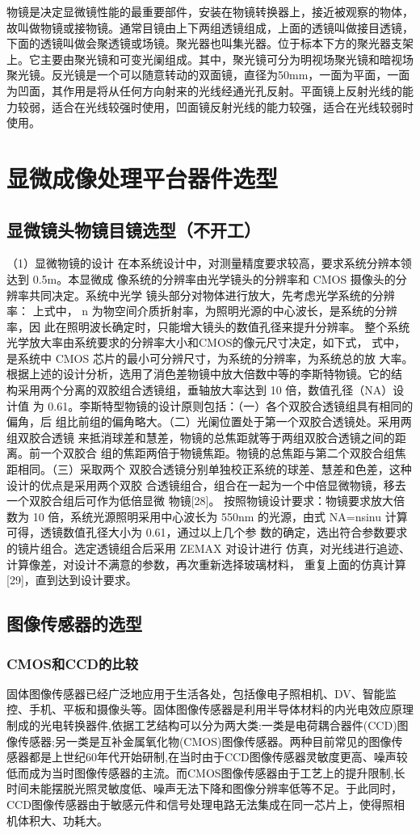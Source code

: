 物镜是决定显微镜性能的最重要部件，安装在物镜转换器上，接近被观察的物体，故叫做物镜或接物镜。通常目镜由上下两组透镜组成，上面的透镜叫做接目透镜，下面的透镜叫做会聚透镜或场镜。聚光器也叫集光器。位于标本下方的聚光器支架上。它主要由聚光镜和可变光阑组成。其中，聚光镜可分为明视场聚光镜和暗视场聚光镜。反光镜是一个可以随意转动的双面镜，直径为50mm，一面为平面，一面为凹面，其作用是将从任何方向射来的光线经通光孔反射。平面镜上反射光线的能力较弱，适合在光线较强时使用，凹面镜反射光线的能力较强，适合在光线较弱时使用。
	 
\section{显微成像处理平台器件选型}
\subsection{显微镜头物镜目镜选型（不开工）}
（1）显微物镜的设计 在本系统设计中，对测量精度要求较高，要求系统分辨本领达到 0.5m。本显微成 像系统的分辨率由光学镜头的分辨率和 CMOS 摄像头的分辨率共同决定。系统中光学 镜头部分对物体进行放大，先考虑光学系统的分辨率：
上式中， n 为物空间介质折射率，为照明光源的中心波长，是系统的分辨率，因 此在照明波长确定时，只能增大镜头的数值孔径来提升分辨率。 整个系统光学放大率由系统要求的分辨率大小和CMOS的像元尺寸决定，如下式，
式中，是系统中 CMOS 芯片的最小可分辨尺寸，为系统的分辨率，为系统总的放 大率。 根据上述的设计分析，选用了消色差物镜中放大倍数中等的李斯特物镜。它的结 构采用两个分离的双胶组合透镜组，垂轴放大率达到 10 倍，数值孔径（NA）设计值 为 0.61。李斯特型物镜的设计原则包括：（一）各个双胶合透镜组具有相同的偏角，后 组比前组的偏角略大。（二）光阑位置处于第一个双胶合透镜处。采用两组双胶合透镜 来抵消球差和慧差，物镜的总焦距就等于两组双胶合透镜之间的距离。前一个双胶合 组的焦距两倍于物镜焦距。物镜的总焦距与第二个双胶合组焦距相同。（三）采取两个 双胶合透镜分别单独校正系统的球差、慧差和色差，这种设计的优点是采用两个双胶 合透镜组合，组合在一起为一个中倍显微物镜，移去一个双胶合组后可作为低倍显微 物镜[28]。 按照物镜设计要求：物镜要求放大倍数为 10 倍，系统光源照明采用中心波长为 550nm 的光源，由式 NA=nsinu 计算可得，透镜数值孔径大小为 0.61，通过以上几个参 数的确定，选出符合参数要求的镜片组合。选定透镜组合后采用 ZEMAX 对设计进行 仿真，对光线进行追迹、计算像差，对设计不满意的参数，再次重新选择玻璃材料， 重复上面的仿真计算[29]，直到达到设计要求。
\subsection{图像传感器的选型}
\subsubsection{CMOS和CCD的比较}
固体图像传感器已经广泛地应用于生活各处，包括像电子照相机、DV、智能监控、手机、平板和摄像头等。固体图像传感器是利用半导体材料的内光电效应原理制成的光电转换器件,依据工艺结构可以分为两大类:一类是电荷耦合器件(CCD)图像传感器;另一类是互补金属氧化物(CMOS)图像传感器。两种目前常见的图像传感器都是上世纪60年代开始研制,在当时由于CCD图像传感器灵敏度更高、噪声较低而成为当时图像传感器的主流。而CMOS图像传感器由于工艺上的提升限制,长时间未能摆脱光照灵敏度低、噪声无法下降和图像分辨率低等不足。于此同时，CCD图像传感器由于敏感元件和信号处理电路无法集成在同一芯片上，使得照相机体积大、功耗大。

